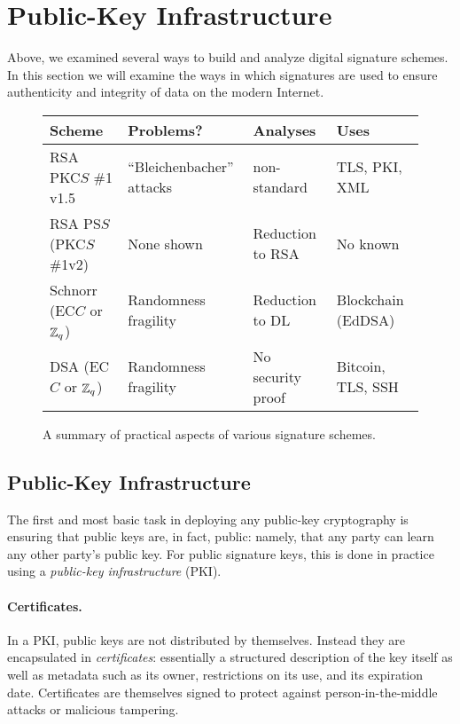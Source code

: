 \section*{Public-Key Infrastructure}
\label{sec:idprots_contd}

Above, we examined several ways to build and analyze digital signature schemes.
In this section we will examine the ways in which signatures are used to
ensure authenticity and integrity of data on the modern Internet.



\begin{figure}[t]
  \centering
  \begin{tabular}{|l|l|p{4cm}|p{4.2cm}|}
    \hline
    Scheme & Problems? & Analyses & Uses\\
    \hline
    \hline
    RSA PKC$S$ \#1 v1.5 & ``Bleichenbacher'' attacks & non-standard~\cite{jager2018security} & TLS, PKI, XML\\
    \hline
    RSA PS$S$ (PKC$S$ \#1v2) & None shown & Reduction to RSA~\cite{bellare1998pss} & No known\\
    \hline
    Schnorr (EC$C$ or ${{\mathbb Z}}_q$) & Randomness fragility &  Reduction to DL~\cite{schnorr1989efficient} & Blockchain (EdDSA)~\cite{eddsa}\\
    \hline
    DSA (EC$C$ or ${{\mathbb Z}}_q$) & Randomness fragility~\cite{ecdsa_ps3} & No security proof & Bitcoin, TLS, SSH\\
    \hline
    \end{tabular}
    \caption{A summary of practical aspects of various signature schemes.}
    \label{fig:realworld-sigs}
  \end{figure}
    



\subsection{Public-Key Infrastructure}
\label{sec:idprots_contd:pki}

The first and most basic task in deploying any public-key cryptography is ensuring that public keys are, in fact, public: namely, that any party can learn any other party's public key. For public signature keys, this is done in practice using a
\emph{public-key infrastructure} (PKI).

\paragraph{Certificates.} In a PKI, public keys are not distributed by themselves.
Instead they are encapsulated in \emph{certificates}: essentially a structured
description of the key itself as well as metadata such as its owner, restrictions
on its use, and its expiration date. Certificates are themselves signed to protect
against person-in-the-middle attacks or malicious tampering.

